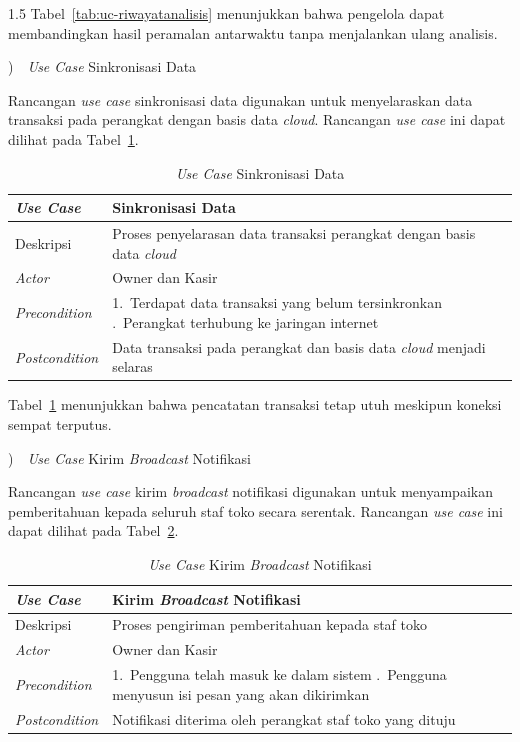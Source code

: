 \documentclass[12pt, a4paper, onecolumn, oneside]{report}
\begin{document}
\begin{spacing}{1.5}
Tabel~\ref{tab:uc-riwayatanalisis} menunjukkan bahwa pengelola dapat membandingkan hasil peramalan antarwaktu tanpa menjalankan ulang analisis.

)~~\textit{Use Case} Sinkronisasi Data

Rancangan \textit{use case} sinkronisasi data digunakan untuk menyelaraskan data transaksi pada perangkat dengan basis data \textit{cloud}. Rancangan \textit{use case} ini dapat dilihat pada Tabel~\ref{tab:uc-sinkron}.

\begin{table}[H]
\centering
\caption{\textit{Use Case} Sinkronisasi Data}
\label{tab:uc-sinkron}
\begin{tabularx}{\textwidth}{|p{3.2cm}|X|}
\hline
\textbf{\textit{Use Case}} & \textbf{Sinkronisasi Data} \\ \hline
Deskripsi & Proses penyelarasan data transaksi perangkat dengan basis data \textit{cloud} \\ \hline
\textit{Actor} & Owner dan Kasir \\ \hline
\textit{Precondition} & 1.~Terdapat data transaksi yang belum tersinkronkan \newline 2.~Perangkat terhubung ke jaringan internet \\ \hline
\textit{Postcondition} & Data transaksi pada perangkat dan basis data \textit{cloud} menjadi selaras \\ \hline
\end{tabularx}
\end{table}

Tabel~\ref{tab:uc-sinkron} menunjukkan bahwa pencatatan transaksi tetap utuh meskipun koneksi sempat terputus.

)~~\textit{Use Case} Kirim \textit{Broadcast} Notifikasi

Rancangan \textit{use case} kirim \textit{broadcast} notifikasi digunakan untuk menyampaikan pemberitahuan kepada seluruh staf toko secara serentak. Rancangan \textit{use case} ini dapat dilihat pada Tabel~\ref{tab:uc-broadcast}.

\begin{table}[H]
\centering
\caption{\textit{Use Case} Kirim \textit{Broadcast} Notifikasi}
\label{tab:uc-broadcast}
\begin{tabularx}{\textwidth}{|p{3.2cm}|X|}
\hline
\textbf{\textit{Use Case}} & \textbf{Kirim \textit{Broadcast} Notifikasi} \\ \hline
Deskripsi & Proses pengiriman pemberitahuan kepada staf toko \\ \hline
\textit{Actor} & Owner dan Kasir \\ \hline
\textit{Precondition} & 1.~Pengguna telah masuk ke dalam sistem \newline 2.~Pengguna menyusun isi pesan yang akan dikirimkan \\ \hline
\textit{Postcondition} & Notifikasi diterima oleh perangkat staf toko yang dituju \\ \hline
\end{tabularx}
\end{table}


\end{spacing}
\end{document}
